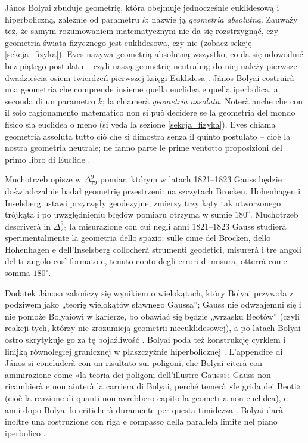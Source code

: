 János Bolyai zbuduje geometrię, która obejmuje jednocześnie euklidesową i hiperboliczną, zależnie od parametru $k$; nazwie ją \emph{geometrią absolutną}. %
Zauważy też, że samym rozumowaniem matematycznym nie da się rozstrzygnąć, czy geometria świata fizycznego jest euklidesowa, czy nie (zobacz sekcję \ref{sekcja_fizyka}). %
Eves nazywa geometrią absolutną wszystko, co da się udowodnić bez piątego postulatu -- czyli naszą geometrię neutralną; do niej należy pierwsze dwadzieścia osiem twierdzeń pierwszej księgi Euklidesa \cite[s. 288]{eves1_1972}. %
János Bolyai costruirà una geometria che comprende insieme quella euclidea e quella iperbolica, a seconda di un parametro $k$; la chiamerà \emph{geometria assoluta}. %
Noterà anche che con il solo ragionamento matematico non si può decidere se la geometria del mondo fisico sia euclidea o meno (si veda la sezione \ref{sekcja_fizyka}). %
Eves chiama geometria assoluta tutto ciò che si dimostra senza il quinto postulato -- cioè la nostra geometria neutrale; ne fanno parte le prime ventotto proposizioni del primo libro di Euclide \cite[p. 288]{eves1_1972}. %

Muchotrzeb opisze w $\Delta_{79}^{9}$ pomiar, którym w latach 1821--1823 Gauss będzie doświadczalnie badał geometrię przestrzeni: na szczytach Brocken, Hohenhagen i Inselsberg ustawi przyrządy geodezyjne, zmierzy trzy kąty tak utworzonego trójkąta i po uwzględnieniu błędów pomiaru otrzyma w sumie $180^\circ$. %
Muchotrzeb descriverà in $\Delta_{79}^{9}$ la misurazione con cui negli anni 1821--1823 Gauss studierà sperimentalmente la geometria dello spazio: sulle cime del Brocken, dello Hohenhagen e dell'Inselsberg collocherà strumenti geodetici, misurerà i tre angoli del triangolo così formato e, tenuto conto degli errori di misura, otterrà come somma $180^\circ$. %

Dodatek Jánosa zakończy się wynikiem o wielokątach, który Bolyai przywoła z podziwem jako „teorię wielokątów sławnego Gaussa''; Gauss nie odwzajemni się i nie pomoże Bolyaiowi w karierze, bo obawiać się będzie „wrzasku Beotów'' (czyli reakcji tych, którzy nie zrozumieją geometrii nieeuklidesowej), a po latach Bolyai ostro skrytykuje go za tę bojaźliwość \cite[s. 213]{greenberg_2010}. %
Bolyai poda też konstrukcję cyrklem i linijką równoległej granicznej w płaszczyźnie hiperbolicznej \cite[s. 210]{greenberg_2010}. %
L'appendice di János si concluderà con un risultato sui poligoni, che Bolyai citerà con ammirazione come «la teoria dei poligoni dell'illustre Gauss»; Gauss non ricambierà e non aiuterà la carriera di Bolyai, perché temerà «le grida dei Beoti» (cioè la reazione di quanti non avrebbero capito la geometria non euclidea), e anni dopo Bolyai lo criticherà duramente per questa timidezza \cite[p. 213]{greenberg_2010}. %
Bolyai darà inoltre una costruzione con riga e compasso della parallela limite nel piano iperbolico \cite[p. 210]{greenberg_2010}. %

